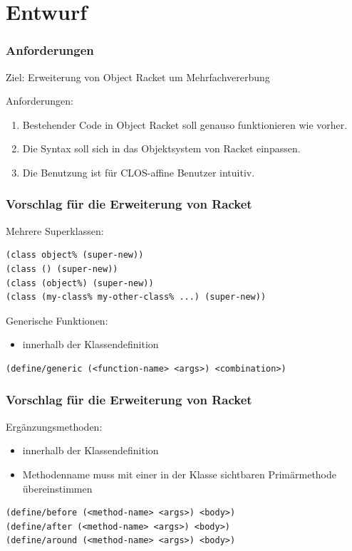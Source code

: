 \documentclass{beamer}
\begin{document}
\section{Entwurf}
\frame{\tableofcontents[currentsection]}

\begin{frame}
 \frametitle{Anforderungen}
 Ziel: Erweiterung von Object Racket um Mehrfachvererbung

 \vspace{0.5cm}
 Anforderungen:
 \begin{enumerate}
  \item Bestehender Code in Object Racket soll genauso funktionieren wie vorher.
  \item Die Syntax soll sich in das Objektsystem von Racket einpassen.
  \item Die Benutzung ist für CLOS-affine Benutzer intuitiv.
 \end{enumerate}
\end{frame}

\begin{frame}[fragile]
 \frametitle{Vorschlag für die Erweiterung von Racket}
 Mehrere Superklassen:
\vspace{0.3cm}
\begin{lstlisting}
(class object% (super-new))
(class () (super-new))
(class (object%) (super-new))
(class (my-class% my-other-class% ...) (super-new))
\end{lstlisting}
\vspace{1.3cm}
\pause
Generische Funktionen:
\begin{itemize}
 \item innerhalb der Klassendefinition
\end{itemize}
\vspace{0.3cm}
\begin{lstlisting}
(define/generic (<function-name> <args>) <combination>)
\end{lstlisting}
\end{frame}

\begin{frame}[fragile]
 \frametitle{Vorschlag für die Erweiterung von Racket}
 Ergänzungsmethoden:
 \begin{itemize}
 \item innerhalb der Klassendefinition
 \item Methodenname muss mit einer in der Klasse sichtbaren Primärmethode übereinstimmen
\end{itemize}
\vspace{0.3cm}
\begin{lstlisting}
(define/before (<method-name> <args>) <body>)
(define/after (<method-name> <args>) <body>)
(define/around (<method-name> <args>) <body>)
\end{lstlisting}
\end{frame}
\end{document}
